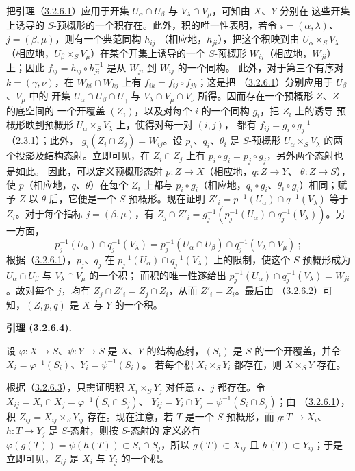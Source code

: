 \documentclass[UTF8,fontset=none,11pt,oneside,openany]{ctexbook}
\newenvironment{lemma}[1][]{%
  \par\medskip\noindent\textbf{引理 (#1).}\ %
}{\par}
\let\EGAOriginalLabel\label
\renewcommand{\label}[1]{\phantomsection\EGAOriginalLabel{#1}}
\begin{document}
把引理（\hyperref[I.3.2.6.1-fr]{3.2.6.1}）应用于开集
$U_\alpha\cap U_\beta$ 与 $V_\lambda\cap V_\mu$，可知由 $X$、$Y$ 分别在
这些开集上诱导的 $S$-预概形的一个积存在。此外，积的唯一性表明，若令
$i=(\alpha,\lambda)$、$j=(\beta,\mu)$，则有一个典范同构 $h_{ij}$
（相应地，$h_{ji}$），把这个积映到由 $U_\alpha\times_S V_\lambda$
（相应地，$U_\beta\times_S V_\mu$）在某个开集上诱导的一个 $S$-预概形
$W_{ij}$（相应地，$W_{ji}$）上；因此
$f_{ij}=h_{ij}\circ h_{ji}^{-1}$ 是从 $W_{ji}$ 到 $W_{ij}$ 的一个同构。
此外，对于第三个有序对 $k=(\gamma,\nu)$，在
$W_{ki}\cap W_{kj}$ 上有 $f_{ik}=f_{ij}\circ f_{jk}$；这是把
（\hyperref[I.3.2.6.1-fr]{3.2.6.1}）分别应用于 $U_\beta$、$V_\mu$ 中的
开集 $U_\alpha\cap U_\beta\cap U_\gamma$ 与
$V_\lambda\cap V_\mu\cap V_\nu$ 所得。因而存在一个预概形 $Z$、$Z$ 的底空间的
一个开覆盖 $(Z_i)$，以及对每个 $i$ 的一个同构 $g_i$，把 $Z_i$ 上的诱导
预概形映到预概形 $U_\alpha\times_S V_\lambda$ 上，使得对每一对 $(i,j)$，
都有 $f_{ij}=g_i\circ g_j^{-1}$（\hyperref[I.2.3.1-fr]{2.3.1}）；此外，
$g_i(Z_i\cap Z_j)=W_{ij}$。设 $p_i$、$q_i$、$\theta_i$ 是 $S$-预概形
$U_\alpha\times_S V_\lambda$ 的两个投影及结构态射。立即可见，在
$Z_i\cap Z_j$ 上有 $p_i\circ g_i=p_j\circ g_j$，另外两个态射也是如此。
因此，可以定义预概形态射 $p:Z\to X$（相应地，$q:Z\to Y$、
$\theta:Z\to S$），使 $p$（相应地，$q$、$\theta$）在每个 $Z_i$ 上都与
$p_i\circ g_i$（相应地，$q_i\circ g_i$、$\theta_i\circ g_i$）相同；赋予
$Z$ 以 $\theta$ 后，它便是一个 $S$-预概形。现在证明
$Z'_i=p^{-1}(U_\alpha)\cap q^{-1}(V_\lambda)$ 等于 $Z_i$。对于每个指标
$j=(\beta,\mu)$，有
$Z_j\cap Z'_i=g_j^{-1}(p_j^{-1}(U_\alpha)\cap q_j^{-1}(V_\lambda))$。另一方面，
\[
  p_j^{-1}(U_\alpha)\cap q_j^{-1}(V_\lambda)
  =p_j^{-1}(U_\alpha\cap U_\beta)\cap
   q_j^{-1}(V_\lambda\cap V_\mu)~;
\]
根据（\hyperref[I.3.2.6.1-fr]{3.2.6.1}），$p_j$、$q_j$ 在
$p_j^{-1}(U_\alpha)\cap q_j^{-1}(V_\lambda)$ 上的限制，使这个
$S$-预概形成为 $U_\alpha\cap U_\beta$ 与 $V_\lambda\cap V_\mu$ 的一个积；
而积的唯一性遂给出
$p_j^{-1}(U_\alpha)\cap q_j^{-1}(V_\lambda)=W_{ji}$。故对每个 $j$，均有
$Z_j\cap Z'_i=Z_j\cap Z_i$，从而 $Z'_i=Z_i$。最后由
（\hyperref[I.3.2.6.2-fr]{3.2.6.2}）可知，$(Z,p,q)$ 是 $X$ 与 $Y$ 的一个积。

\begin{lemma}[3.2.6.4]
\label{I.3.2.6.4-fr}
设 $\varphi:X\to S$、$\psi:Y\to S$ 是 $X$、$Y$ 的结构态射，$(S_i)$ 是
$S$ 的一个开覆盖，并令 $X_i=\varphi^{-1}(S_i)$、$Y_i=\psi^{-1}(S_i)$。
若每个积 $X_i\times_S Y_i$ 都存在，则 $X\times_S Y$ 存在。
\end{lemma}

根据（\hyperref[I.3.2.6.3-fr]{3.2.6.3}），只需证明积
$X_i\times_S Y_j$ 对任意 $i$、$j$ 都存在。令
$X_{ij}=X_i\cap X_j=\varphi^{-1}(S_i\cap S_j)$、
$Y_{ij}=Y_i\cap Y_j=\psi^{-1}(S_i\cap S_j)$；由
（\hyperref[I.3.2.6.1-fr]{3.2.6.1}），积
$Z_{ij}=X_{ij}\times_S Y_{ij}$ 存在。现在注意，若 $T$ 是一个
$S$-预概形，而 $g:T\to X_i$、$h:T\to Y_j$ 是 $S$-态射，则按 $S$-态射的
定义必有 $\varphi(g(T))=\psi(h(T))\subset S_i\cap S_j$，所以
$g(T)\subset X_{ij}$ 且 $h(T)\subset Y_{ij}$；于是立即可见，$Z_{ij}$ 是
$X_i$ 与 $Y_j$ 的一个积。
\end{document}
